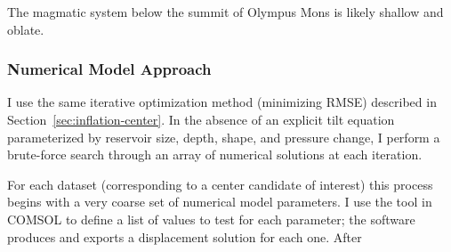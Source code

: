 The magmatic system below the summit of Olympus Mons is likely shallow and oblate. 

\subsubsection{Numerical Model Approach}

I use the same iterative optimization method (minimizing \acs{RMSE}) described in Section~\ref{sec:inflation-center}. In the absence of an explicit tilt equation parameterized by reservoir size, depth, shape, and pressure change, I perform a brute-force search through an array of numerical solutions at each iteration.

For each dataset (corresponding to a center candidate of interest) this process begins with a very coarse set of numerical model parameters. I use the  tool in COMSOL to define a list of values to test for each parameter; the software produces and exports a displacement solution for each one. After